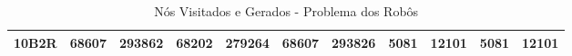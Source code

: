 \begin{table}[H]
\begin{tabular}{l|l|l|l|l|l|l|l|l|l|l|}
\multicolumn{1}{|l|}{10B2R} & 68607      & 293862     & 68202                               & 279264                               & 68607                                     & 293826                                   & 5081                                & 12101                             & 5081                                & 12101                             \\ \hline
\end{tabular}
\caption{Nós Visitados e Gerados - Problema dos Robôs}
\label{tab:nosRobos}
\end{table}